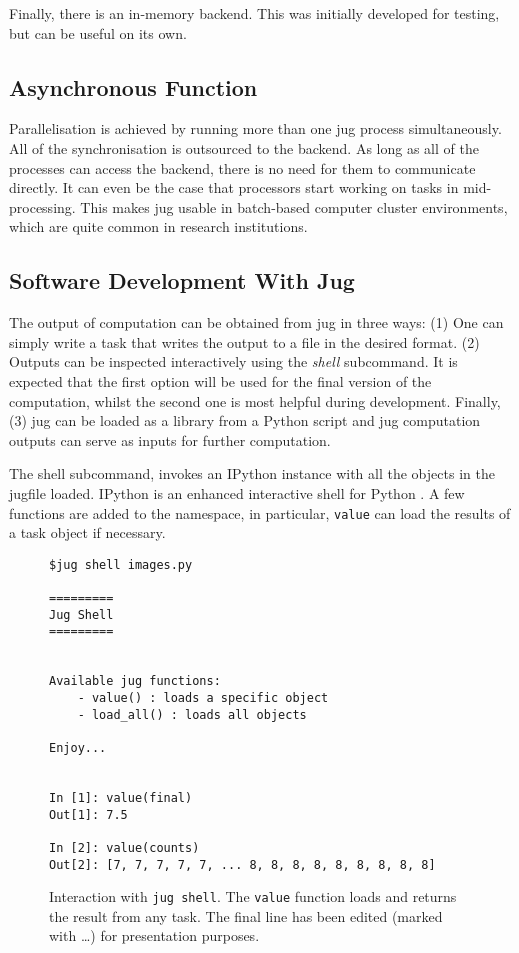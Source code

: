 \documentclass{article}
\let\code\texttt
\begin{document}
Finally, there is an in-memory backend. This was initially developed for
testing, but can be useful on its own.

\subsection{Asynchronous Function}

Parallelisation is achieved by running more than one jug process
simultaneously. All of the synchronisation is outsourced to the backend. As
long as all of the processes can access the backend, there is no need for them
to communicate directly. It can even be the case that processors start working
on tasks in mid-processing. This makes jug usable in batch-based computer
cluster environments, which are quite common in research institutions.

\subsection{Software Development With Jug}

The output of computation can be obtained from jug in three ways: (1) One can
simply write a task that writes the output to a file in the desired format. (2)
Outputs can be inspected interactively using the \emph{shell} subcommand. It is
expected that the first option will be used for the final version of the
computation, whilst the second one is most helpful during development. Finally,
(3) jug can be loaded as a library from a Python script and jug computation
outputs can serve as inputs for further computation.

The shell subcommand, invokes an IPython instance with all the objects in the
jugfile loaded. IPython is an enhanced interactive shell for Python
\citep{Perez2007}. A few functions are added to the namespace, in particular,
\code{value} can load the results of a task object if necessary.

\begin{figure}
\begin{center}
\begin{verbatim}
$jug shell images.py

=========
Jug Shell
=========


Available jug functions:
    - value() : loads a specific object
    - load_all() : loads all objects

Enjoy...


In [1]: value(final)
Out[1]: 7.5

In [2]: value(counts)
Out[2]: [7, 7, 7, 7, 7, ... 8, 8, 8, 8, 8, 8, 8, 8, 8]
\end{verbatim}
\end{center}
\caption{Interaction with \code{jug shell}. The \code{value} function loads and
returns the result from any task. The final line has been edited (marked with
\ldots) for presentation purposes.}
\label{fig:jug-shell-interaction}
\end{figure}
\end{document}
